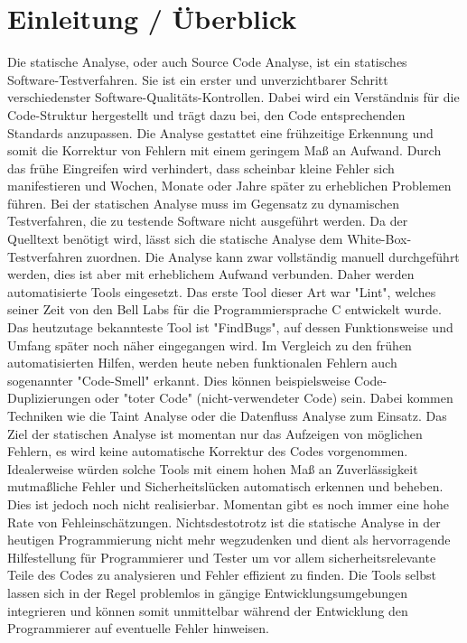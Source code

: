\section{Einleitung / \"Uberblick}
Die statische Analyse, oder auch Source Code Analyse, ist ein statisches Software-Testverfahren. Sie ist ein erster und unverzichtbarer Schritt verschiedenster Software-Qualitäts-Kontrollen. Dabei wird ein Verständnis für die Code-Struktur hergestellt und trägt dazu bei, den Code entsprechenden Standards anzupassen.
Die Analyse gestattet eine frühzeitige Erkennung und somit die Korrektur von Fehlern mit einem geringem Maß an Aufwand. Durch das frühe Eingreifen wird verhindert, dass scheinbar kleine Fehler sich manifestieren und Wochen, Monate oder Jahre später zu erheblichen Problemen führen. 
Bei der statischen Analyse muss im Gegensatz zu dynamischen Testverfahren, die zu testende Software nicht ausgeführt werden. Da der Quelltext benötigt wird, lässt sich die statische Analyse dem White-Box-Testverfahren zuordnen.
Die Analyse kann zwar vollständig manuell durchgeführt werden, dies ist aber mit erheblichem Aufwand verbunden. Daher werden automatisierte Tools eingesetzt. Das erste Tool dieser Art war "Lint", welches seiner Zeit von den Bell Labs für die Programmiersprache C entwickelt wurde. Das heutzutage bekannteste Tool ist "FindBugs", auf dessen Funktionsweise und Umfang später noch näher eingegangen wird. Im Vergleich zu den frühen automatisierten Hilfen, werden heute neben funktionalen Fehlern auch sogenannter "Code-Smell" erkannt. Dies können beispielsweise Code-Duplizierungen oder "toter Code" (nicht-verwendeter Code) sein. Dabei kommen Techniken wie die Taint Analyse oder die Datenfluss Analyse zum Einsatz.
Das Ziel der statischen Analyse ist momentan nur das Aufzeigen von möglichen Fehlern, es wird keine automatische Korrektur des Codes vorgenommen. Idealerweise würden solche Tools mit einem hohen Maß an Zuverlässigkeit mutmaßliche Fehler und Sicherheitslücken automatisch erkennen und beheben. Dies ist jedoch noch nicht realisierbar. Momentan gibt es noch immer eine hohe Rate von Fehleinschätzungen. 
Nichtsdestotrotz ist die statische Analyse in der heutigen Programmierung nicht mehr wegzudenken und dient als hervorragende Hilfestellung für Programmierer und Tester um vor allem sicherheitsrelevante Teile des Codes zu analysieren und Fehler effizient zu finden.
Die Tools selbst lassen sich in der Regel problemlos in gängige Entwicklungsumgebungen integrieren und können somit unmittelbar während der Entwicklung den Programmierer auf eventuelle Fehler hinweisen.
